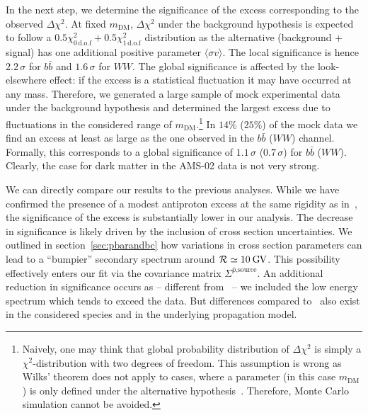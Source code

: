 \documentclass[a4paper,11pt]{article}
\newcommand{\eVdist}{\kern-0.06em}
\newcommand{\gv}{\:\text{G\eVdist V}}
\newcommand{\R}{\mathcal{R}}
\begin{document}
In the next step, we determine the significance of the excess corresponding to the observed $\Delta\chi^2$. At fixed $m_{\text{DM}}$, $\Delta\chi^2$ under the background hypothesis is expected to follow a $0.5 \chi_{0\,\text{d.o.f}}^2+0.5 \chi_{1\,\text{d.o.f}}^2$ distribution as the alternative (background + signal) has one additional positive parameter $\langle\sigma v \rangle$. The local significance is hence $2.2\,\sigma$ for $b\bar{b}$ and $1.6\,\sigma$ for $WW$. The global significance is affected by the look-elsewhere effect: if the excess is a statistical fluctuation it may have occurred at any mass. Therefore, we generated a large sample of mock experimental data under the background hypothesis and determined the largest excess due to fluctuations in the considered range of $m_{\text{DM}}$.\footnote{Naively, one may think that global probability distribution of $\Delta\chi^2$ is simply a $\chi^2$-distribution with two degrees of freedom. This assumption is wrong as Wilks' theorem does not apply to cases, where a parameter (in this case $m_{\text{DM}}$) is only defined under the alternative hypothesis~\cite{Davies:1987zz,Gross:2010qma}. Therefore, Monte Carlo simulation cannot be avoided.} In $14\%$ ($25\%$) of the mock data we find an excess at least as large as the one observed in the $b\bar{b}$ ($WW$) channel. Formally, this corresponds to a global significance of $1.1\,\sigma$ ($0.7\,\sigma$) for $b\bar{b}$ ($WW$). Clearly, the case for dark matter in the AMS-02 data is not very strong. 

We can directly compare our results to the previous analyses. While we have confirmed the presence of a modest antiproton excess at the same rigidity as in~\cite{Cuoco:2016eej,Cui:2016ppb}, the significance of the excess is substantially lower in our analysis. The decrease in significance is likely driven by the inclusion of cross section uncertainties. We outlined in section~\ref{sec:pbarandbc} how variations in cross section parameters can lead to a ``bumpier'' secondary spectrum around $\R\simeq 10\gv$. This possibility effectively enters our fit via the covariance matrix $\Sigma^\text{$\bar{p}$,source}$. An additional reduction in significance occurs as -- different from~\cite{Cuoco:2016eej} -- we included the low energy spectrum which tends to exceed the data. But differences compared to~\cite{Cuoco:2016eej,Cui:2016ppb} also exist in the considered species and in the underlying propagation model.
\end{document}
